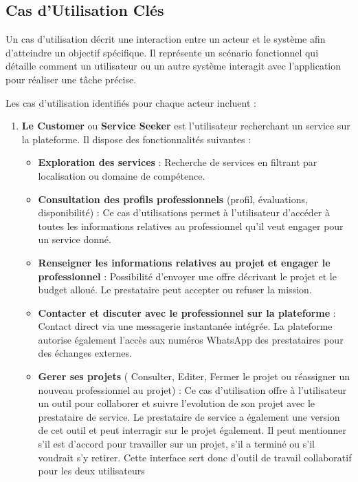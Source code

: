 {\subsection{Cas d’Utilisation Clés}

Un cas d’utilisation décrit une interaction entre un acteur et le système afin d’atteindre un objectif spécifique. Il représente un scénario fonctionnel qui détaille comment un utilisateur ou un autre système interagit avec l’application pour réaliser une tâche précise.

\vspace{0.39cm}

Les cas d'utilisation identifiés pour chaque acteur incluent :

\vspace{0.39cm}

\begin{enumerate}
    \item \textbf{Le Customer} ou \textbf{Service Seeker} est l’utilisateur recherchant un service sur la plateforme. Il dispose des fonctionnalités suivantes : 
    \vspace{0.39cm}
        \begin{itemize}
            \item \textbf{Exploration des services} : Recherche de services en filtrant par localisation ou domaine de compétence. 
            \item \textbf{Consultation des profils professionnels} (profil, évaluations, disponibilité) : Ce cas d'utilisations permet à l'utilisateur d'accéder à toutes les informations relatives au professionnel qu'il  veut engager pour un service donné.
            \item \textbf{Renseigner les informations relatives au projet et engager le professionnel} : Possibilité d’envoyer une offre décrivant le projet et le budget alloué. Le prestataire peut accepter ou refuser la mission.
            \item \textbf{Contacter et discuter avec le professionnel sur la plateforme} : Contact direct via une messagerie instantanée intégrée. La plateforme autorise également l’accès aux numéros WhatsApp des prestataires pour des échanges externes.
            \item \textbf{Gerer ses projets} ( Consulter, Editer, Fermer le projet ou réassigner un nouveau professionnel au projet) : Ce cas d'utilisation offre à l'utilisateur un outil pour collaborer et suivre l'evolution de son projet avec le prestataire de service. Le prestataire de service a également une version de cet outil et peut interragir sur le projet également. Il peut mentionner s'il est d'accord pour travailler sur un projet, s'il a terminé ou s'il voudrait s'y retirer. Cette interface sert donc d'outil de travail collaboratif pour les deux utilisateurs

\end{itemize}
\end{enumerate}}

